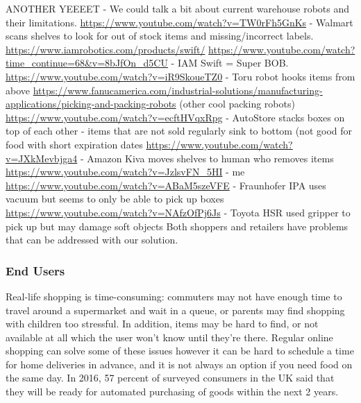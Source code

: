 \documentclass[12pt]{article}
\begin{document}
ANOTHER YEEEET - We could talk a bit about current warehouse robots and their limitations.
\newline\newline
\url{https://www.youtube.com/watch?v=TW0rFh5GnKs} - Walmart scans shelves to look for out of stock items and missing/incorrect labels.
\newline\newline
\url{https://www.iamrobotics.com/products/swift/}
\url{https://www.youtube.com/watch?time_continue=68&v=8bJfOn_d5CU} - IAM Swift = Super BOB. 
\newline\newline
\url{https://www.youtube.com/watch?v=iR9SkoueTZ0} - Toru robot hooks items from above \newline
\url{https://www.fanucamerica.com/industrial-solutions/manufacturing-applications/picking-and-packing-robots} (other cool packing robots)
\newline\newline
\url{https://www.youtube.com/watch?v=ecftHVqxRpg} - AutoStore stacks boxes on top of each other - items that are not sold regularly sink to bottom (not good for food with short expiration dates
\newline\newline 
\url{https://www.youtube.com/watch?v=JXkMevbjga4} - Amazon Kiva moves shelves to human who removes items 
\newline\newline
\url{https://www.youtube.com/watch?v=JzlsvFN_5HI} - me 
\newline\newline
\url{https://www.youtube.com/watch?v=ABaM5szeVFE} - Fraunhofer IPA uses vacuum but seems to only be able to pick up boxes
\newline\newline 
\url{https://www.youtube.com/watch?v=NAfzOfPj6Js} - Toyota HSR used gripper to pick up but may damage soft objects 
\newline\newline
Both shoppers and retailers have problems that can be addressed with our solution.

\subsubsection*{End Users}

Real-life shopping is time-consuming: commuters may not have enough time to travel around a supermarket and wait in a queue, or parents may find shopping with children too stressful. In addition, items may be hard to find, or not available at all which the user won't know until they're there. Regular online shopping can solve some of these issues however it can be hard to schedule a time for home deliveries in advance, and it is not always an option if you need food on the same day.
\newline\newline
In 2016, 57 percent of surveyed consumers in the UK said that they will be ready for automated purchasing of goods within the next 2 years. \cite{munden_makris_fletcher_2016}
\end{document}
